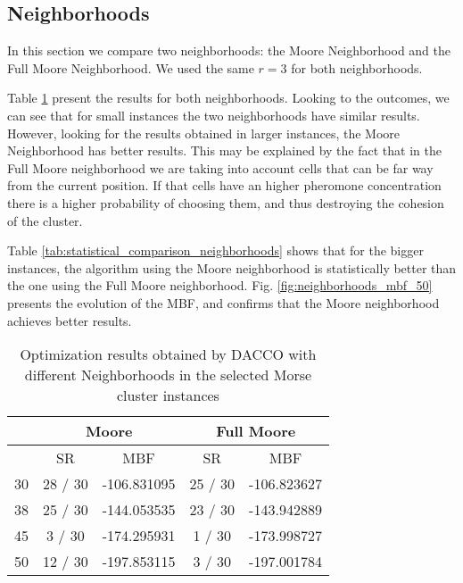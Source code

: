 		\subsection{Neighborhoods}
		
		In this section we compare two neighborhoods: the Moore Neighborhood and the Full Moore Neighborhood. We used the same $r = 3$ for both neighborhoods.
		
		Table \ref{tab:neighborhood_results} present the results for both neighborhoods. Looking to the outcomes, we can see that for small instances the two neighborhoods have similar results. However, looking for the results obtained in larger instances, the Moore Neighborhood has better results. This may be explained by the fact that in the Full Moore neighborhood we are taking into account cells that can be far way from the current position. If that cells have an higher pheromone concentration there is a higher probability of choosing them, and thus destroying the cohesion of the cluster. 
		
		Table \ref{tab:statistical_comparison_neighborhoods} shows that for the bigger instances, the algorithm using the Moore neighborhood is statistically better than the one using the Full Moore neighborhood. Fig. \ref{fig:neighborhoods_mbf_50} presents the evolution of the MBF, and confirms that the Moore neighborhood achieves better results. 
		
		\begin{table}[!htdp]
				\begin{center}
					\begin{tabular}{| c | c | c | c | c |}
						\hline
						~ & \multicolumn{2}{c|}{\textbf{Moore}} & \multicolumn{2}{c|}{\textbf{Full Moore}} \\ \hline
						~ & SR & MBF & SR & MBF \\ \hline
						30 & 28 / 30 & -106.831095 & 25 / 30 & -106.823627 \\ \hline
						38 & 25 / 30 & -144.053535 & 23 / 30 & -143.942889 \\ \hline
						45 & 3 / 30 & -174.295931 &  1 / 30 &  -173.998727 \\ \hline
						50 & 12 / 30 & -197.853115 & 3 / 30 &  -197.001784 \\ \hline
					\end{tabular}
					\caption{Optimization results obtained by DACCO with different Neighborhoods in the selected Morse cluster instances}
					\label{tab:neighborhood_results}
				\end{center}
		\end{table}
		
